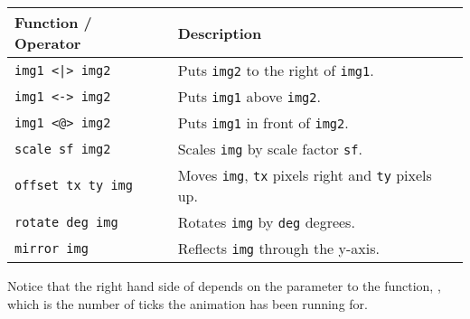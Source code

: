 \begin{table}[H]
\centering
\begin{tabular}{ll}
Function / Operator       & Description                                          \\ \hline
\texttt{img1 <|> img2}    & Puts \texttt{img2} to the right of \texttt{img1}. \\
\texttt{img1 <-> img2}    & Puts \texttt{img1} above \texttt{img2}.           \\
\texttt{img1 <@> img2}    & Puts \texttt{img1} in front of \texttt{img2}.     \\
\texttt{scale sf img2}    & Scales \texttt{img} by scale factor \texttt{sf}.  \\
\texttt{offset tx ty img} & Moves \texttt{img}, \texttt{tx} pixels right and \texttt{ty} pixels up. \\
\texttt{rotate deg img}   & Rotates \texttt{img} by \texttt{deg} degrees.     \\
\texttt{mirror img}       & Reflects \texttt{img} through the y-axis.
\end{tabular}
\end{table}

Notice that the right hand side of  depends on the parameter to the  function, , which is the number of ticks the animation has been running for.
